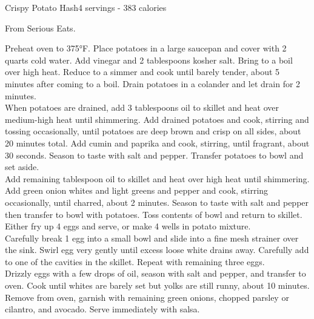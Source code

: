 \begin{recipe}{Crispy Potato Hash}{4 servings - 383 calories}{}

\freeform From Serious Eats.


Preheat oven to 375°F. Place potatoes in a large saucepan and cover with 2 quarts cold water. Add vinegar and 2 tablespoons kosher salt. Bring to a boil over high heat. Reduce to a simmer and cook until barely tender, about 5 minutes after coming to a boil. Drain potatoes in a colander and let drain for 2 minutes.\\

When potatoes are drained, add 3 tablespoons oil to skillet and heat over medium-high heat until shimmering. Add drained potatoes and cook, stirring and tossing occasionally, until potatoes are deep brown and crisp on all sides, about 20 minutes total. Add cumin and paprika and cook, stirring, until fragrant, about 30 seconds. Season to taste with salt and pepper. Transfer potatoes to bowl and set aside.\\

Add remaining tablespoon oil to skillet and heat over high heat until shimmering. Add green onion whites and light greens and pepper and cook, stirring occasionally, until charred, about 2 minutes. Season to taste with salt and pepper then transfer to bowl with potatoes. Toss contents of bowl and return to skillet. Either fry up 4 eggs and serve, or make 4 wells in potato mixture.\\

Carefully break 1 egg into a small bowl and slide into a fine mesh strainer over the sink. Swirl egg very gently until excess loose white drains away. Carefully add to one of the cavities in the skillet. Repeat with remaining three eggs.\\

Drizzly eggs with a few drops of oil, season with salt and pepper, and transfer to oven. Cook until whites are barely set but yolks are still runny, about 10 minutes. Remove from oven, garnish with remaining green onions, chopped parsley or cilantro, and avocado. Serve immediately with salsa.\\



\end{recipe}